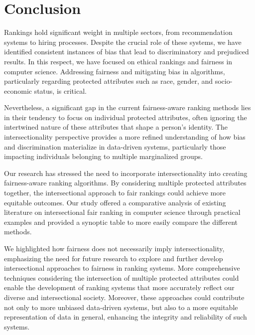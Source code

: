 \section{Conclusion}
\label{ch:conclusions}%

Rankings hold significant weight in multiple sectors, from recommendation systems to hiring processes. Despite the crucial role of these systems, we have identified consistent instances of bias that lead to discriminatory and prejudiced results.
In this respect, we have focused on ethical rankings and fairness in computer science. Addressing fairness and mitigating bias in algorithms, particularly regarding protected attributes such as race, gender, and socio-economic status, is critical.

Nevertheless, a significant gap in the current fairness-aware ranking methods lies in their tendency to focus on individual protected attributes, often ignoring the intertwined nature of these attributes that shape a person's identity.
The intersectionality perspective provides a more refined understanding of how bias and discrimination materialize in data-driven systems, particularly those impacting individuals belonging to multiple marginalized groups.

Our research has stressed the need to incorporate intersectionality into creating fairness-aware ranking algorithms. By considering multiple protected attributes together, the intersectional approach to fair rankings could achieve more equitable outcomes.
Our study offered a comparative analysis of existing literature on intersectional fair ranking in computer science through practical examples and provided a synoptic table to more easily compare the different methods.

We highlighted how fairness does not necessarily imply intersectionality, emphasizing the need for future research to explore and further develop intersectional approaches to fairness in ranking systems. More comprehensive techniques considering the intersection of multiple protected attributes could enable the development of ranking systems that more accurately reflect our diverse and intersectional society. Moreover, these approaches could contribute not only to more unbiased data-driven systems, but also to a more equitable representation of data in general, enhancing the integrity and reliability of such systems. 

